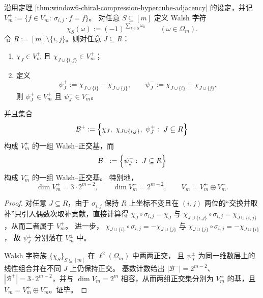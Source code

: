 \begin{theorem}\label{thm:window6-affine-chiral-walsh-decomposition}
沿用定理 \ref{thm:window6-chiral-compression-hypercube-adjacency} 的设定，并记
\(
V_m^+:=\{f\in V_m:\ \sigma_{i,j}\cdot f=f\}
\)。
对任意 \(S\subseteq[m]\) 定义 Walsh 字符
\[
\chi_S(\omega):=(-1)^{\sum_{k\in S}\omega_k}\qquad(\omega\in\Omega_m).
\]
令 \(R:=[m]\setminus\{i,j\}\)。则对任意 \(J\subseteq R\)：
\begin{enumerate}
  \item \(\chi_J\in V_m^+\) 且 \(\chi_{J\cup\{i,j\}}\in V_m^+\)；
  \item 定义
  \[
  \psi_J^+:=\chi_{J\cup\{i\}}-\chi_{J\cup\{j\}},
  \qquad
  \psi_J^-:=\chi_{J\cup\{i\}}+\chi_{J\cup\{j\}},
  \]
  则 \(\psi_J^+\in V_m^+\) 且 \(\psi_J^-\in V_m^-\)。
\end{enumerate}
并且集合
\[
\mathcal B^+:=\Bigl\{\chi_J,\ \chi_{J\cup\{i,j\}},\ \psi_J^+:\ J\subseteq R\Bigr\}
\]
构成 \(V_m^+\) 的一组 Walsh--正交基，而
\[
\mathcal B^-:=\Bigl\{\psi_J^-:\ J\subseteq R\Bigr\}
\]
构成 \(V_m^-\) 的一组 Walsh--正交基。
特别地，
\[
\dim V_m^+=3\cdot 2^{m-2},
\qquad
\dim V_m^-=2^{m-2},
\qquad
V_m=V_m^+\oplus V_m^-.
\]
\end{theorem}
\begin{proof}
对任意 \(J\subseteq R\)，由于 \(\sigma_{i,j}\) 保持 \(R\) 上坐标不变且在 \((i,j)\) 两位的“交换并取补”只引入偶数次取补贡献，直接计算得
\(
\chi_J\circ\sigma_{i,j}=\chi_J
\)
与
\(
\chi_{J\cup\{i,j\}}\circ\sigma_{i,j}=\chi_{J\cup\{i,j\}}
\)，从而二者属于 \(V_m^+\)。
进一步，
\(
\chi_{J\cup\{i\}}\circ\sigma_{i,j}=-\chi_{J\cup\{j\}}
\)
与
\(
\chi_{J\cup\{j\}}\circ\sigma_{i,j}=-\chi_{J\cup\{i\}}
\)，
故 \(\psi_J^\pm\) 分别落在 \(V_m^\pm\) 中。
\par
Walsh 字符族 \(\{\chi_S\}_{S\subseteq[m]}\) 在 \(\ell^2(\Omega_m)\) 中两两正交，
且 \(\psi_J^\pm\) 为同一维数层上的线性组合并在不同 \(J\) 上仍保持正交。
基数计数给出 \(|\mathcal B^-|=2^{m-2}\)、\(|\mathcal B^+|=3\cdot 2^{m-2}\)，并与 \(\dim V_m=2^m\) 相容，从而两组正交集分别为 \(V_m^\pm\) 的基，且 \(V_m=V_m^+\oplus V_m^-\)。证毕。
\end{proof}

